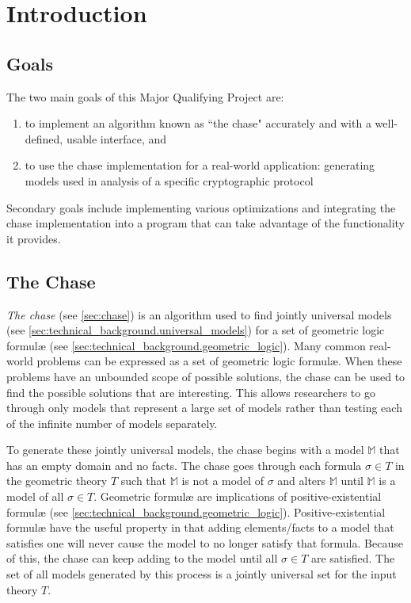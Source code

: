 \section{Introduction}

	\subsection{Goals}

		The two main goals of this Major Qualifying Project are:

		\begin{enumerate}
		\item to implement an algorithm known as ``the chase" accurately
		and with a well-defined, usable interface, and
		\item to use the chase implementation for a real-world
		application: generating models used in analysis of a specific
		cryptographic protocol
		\end{enumerate}

		Secondary goals include implementing various optimizations and
		integrating the chase implementation into a program that can take
		advantage of the functionality it provides.

	\subsection{The Chase}

		\emph{The chase} (see \ref{sec:chase}) is an algorithm used to find
		jointly universal models (see
		\ref{sec:technical_background.universal_models}) for a set of geometric
		logic formul{\ae} (see \ref{sec:technical_background.geometric_logic}).
		Many common real-world problems can be expressed as a set of geometric
		logic formul{\ae}. When these problems have an unbounded scope of
		possible solutions, the chase can be used to find the possible
		solutions that are interesting. This allows researchers to go through
		only models that represent a large set of models rather than testing
		each of the infinite number of models separately.

		To generate these jointly universal models, the chase begins with a model
		$\mathbb{M}$ that has an empty domain and no facts. The chase goes
		through each formula $\sigma \in T$ in the geometric theory $T$ such that
		$\mathbb{M}$ is not a model of $\sigma$ and alters $\mathbb{M}$ until
		$\mathbb{M}$ is a model of all $\sigma \in T$. Geometric formul{\ae}
		are implications of positive-existential formul{\ae} (see
		\ref{sec:technical_background.geometric_logic}). Positive-existential
		formul{\ae} have the useful property in that adding elements/facts to a
		model that satisfies one will never cause the model to no longer
		satisfy that formula. Because of this, the chase can keep adding to the
		model until all $\sigma \in T$ are satisfied. The set of all models
		generated by this process is a jointly universal set for the input theory
		$T$.


